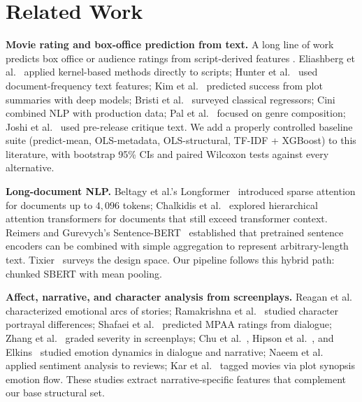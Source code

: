 \documentclass[runningheads]{llncs}
\begin{document}
\section{Related Work}

\noindent\textbf{Movie rating and box-office prediction from text.}
A long line of work predicts box office or audience ratings from
script-derived features
\cite{ref3,ref4,ref7,ref8,ref9,ref15,ref17,ref26,ref27,ref29,ref33,ref37}.
Eliashberg et al.~\cite{ref3} applied kernel-based methods directly
to scripts; Hunter et al.~\cite{ref4} used document-frequency text
features; Kim et al.~\cite{ref9} predicted success from plot
summaries with deep models; Bristi et al.~\cite{ref26} surveyed
classical regressors; Cini~\cite{ref7} combined NLP with production
data; Pal et al.~\cite{ref37} focused on genre composition;
Joshi et al.~\cite{ref20} used pre-release critique text. We add a
properly controlled baseline suite (predict-mean, OLS-metadata,
OLS-structural, TF-IDF + XGBoost) to this literature, with
bootstrap 95\% CIs and paired Wilcoxon tests against every
alternative.

\noindent\textbf{Long-document NLP.}
Beltagy et al.'s Longformer~\cite{ref1} introduced sparse attention
for documents up to $4{,}096$ tokens; Chalkidis et
al.~\cite{ref19} explored hierarchical attention transformers for
documents that still exceed transformer context. Reimers and
Gurevych's Sentence-BERT~\cite{ref2} established that pretrained
sentence encoders can be combined with simple aggregation to
represent arbitrary-length text. Tixier~\cite{ref36} surveys the
design space. Our pipeline follows this hybrid path: chunked SBERT
with mean pooling.

\noindent\textbf{Affect, narrative, and character analysis from
screenplays.}
Reagan et al.~\cite{ref5} characterized emotional arcs of stories;
Ramakrishna et al.~\cite{ref6} studied character portrayal
differences; Shafaei et al.~\cite{ref10} predicted MPAA ratings
from dialogue; Zhang et al.~\cite{ref11} graded severity in
screenplays; Chu et al.~\cite{ref12}, Hipson et al.~\cite{ref13},
and Elkins~\cite{ref14} studied emotion dynamics in dialogue and
narrative; Naeem et al.~\cite{ref18} applied sentiment analysis to
reviews; Kar et al.~\cite{ref35} tagged movies via plot synopsis
emotion flow. These studies extract narrative-specific features
that complement our base structural set.
\end{document}
